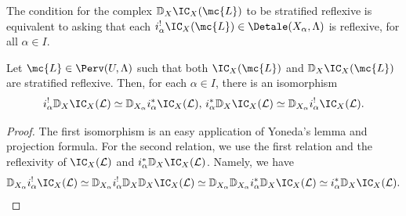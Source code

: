\documentclass[letterpaper,11pt]{amsart}
\begin{document}
\begin{remark}
    The condition for the complex $\mathbb{D}_X\IC_X(\mc{L})$ to be stratified reflexive is equivalent to asking that each $i_\alpha^! \IC_X(\mc{L}) \in \Detale(X_\alpha,\Lambda)$ is reflexive, for all $\alpha\in I$.
\end{remark}



\begin{lemma}\label{lemma: relationVerdierDuality}
Let $\mc{L} \in \Perv(U,\Lambda)$ such that both $\IC_X(\mc{L})$ and $\mathbb{D}_X\IC_X(\mc{L})$ are stratified reflexive. Then, for each $\alpha\in I$, there is an isomorphism
    \[i_\alpha^!\mathbb{D}_X\IC_X(\mathcal{L}) \simeq \mathbb{D}_{X_\alpha} i_\alpha^\ast\IC_X(\mathcal{L}), \,i_\alpha^\ast\mathbb{D}_X\IC_{X}(\mathcal{L}) \simeq \mathbb{D}_{X_\alpha}i_\alpha^!\IC_{X}(\mathcal{L}).\]
\end{lemma}
\begin{proof}
    The first isomorphism is an easy application of Yoneda's lemma and projection formula. 
    For the second relation, we use the first relation and the reflexivity of $\IC_X(\mathcal{L})$ and $i_\alpha^\ast\mathbb{D}_X\IC_X(\mathcal{L})$. Namely, we have     
    \[\mathbb{D}_{X_\alpha}i_\alpha^! \IC_X(\mathcal{L}) \simeq\mathbb{D}_{X_\alpha}i_\alpha^!\mathbb{D}_X \mathbb{D}_X \IC_X(\mathcal{L}) \simeq\mathbb{D}_{X_\alpha} \mathbb{D}_{X_\alpha} i_\alpha^\ast\mathbb{D}_X  \IC_X(\mathcal{L}) \simeq i_\alpha^\ast \mathbb{D}_X\IC_X(\mathcal{L}).\]
\end{proof}
\end{document}
